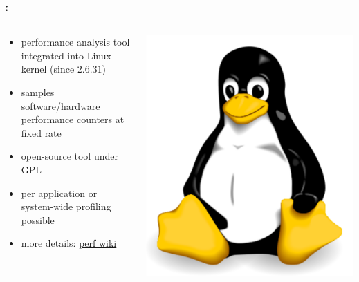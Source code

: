\documentclass[9pt,xcolor=table]{beamer}
\begin{document}
\begin{frame}
\frametitle{\insertsectionhead{}: \insertsubsectionhead{}}
\begin{columns}[t]
    \begin{column}{.65\textwidth}
      \begin{itemize}
      \item performance analysis tool integrated into Linux kernel (since $2.6.31$)
      \item samples software/hardware performance counters at fixed rate
      \item open-source tool under GPL
      \item per application or system-wide profiling possible
      \item more details: \href{https://perf.wiki.kernel.org/index.php/Main_Page}{perf wiki}
      \end{itemize}
    \end{column}
    \begin{column}{.3\textwidth}
      \begin{center}
      \includegraphics[width=\textwidth]{img/Tux}
    \end{center}

\end{column}
\end{columns}
\end{frame}
\end{document}

